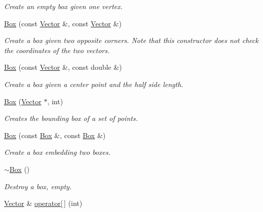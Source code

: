 \begin{DoxyCompactItemize}
\begin{DoxyCompactList}\small\item\em Create an empty box given one vertex. \item\end{DoxyCompactList}\item 
\hyperlink{class_box_a3b265aca59fbaf89be6f7a254088698a}{Box} (const \hyperlink{class_vector}{Vector} \&, const \hyperlink{class_vector}{Vector} \&)
\begin{DoxyCompactList}\small\item\em Create a box given two opposite corners. Note that this constructor does not check the coordinates of the two vectors. \item\end{DoxyCompactList}\item 
\hyperlink{class_box_aa151dd75dfbe1632979853fe157322ea}{Box} (const \hyperlink{class_vector}{Vector} \&, const double \&)
\begin{DoxyCompactList}\small\item\em Create a box given a center point and the half side length. \item\end{DoxyCompactList}\item 
\hyperlink{class_box_a85ed08338073ace8d12833af0c861efb}{Box} (\hyperlink{class_vector}{Vector} $\ast$, int)
\begin{DoxyCompactList}\small\item\em Creates the bounding box of a set of points. \item\end{DoxyCompactList}\item 
\hypertarget{class_box_a0a7c6f0b0405db01518bb3201b00c9a2}{
\hyperlink{class_box_a0a7c6f0b0405db01518bb3201b00c9a2}{Box} (const \hyperlink{class_box}{Box} \&, const \hyperlink{class_box}{Box} \&)}
\label{class_box_a0a7c6f0b0405db01518bb3201b00c9a2}

\begin{DoxyCompactList}\small\item\em Create a box embedding two boxes. \item\end{DoxyCompactList}\item 
\hypertarget{class_box_a6a5e09398e85d602a046b429062fb9c2}{
\hyperlink{class_box_a6a5e09398e85d602a046b429062fb9c2}{$\sim$Box} ()}
\label{class_box_a6a5e09398e85d602a046b429062fb9c2}

\begin{DoxyCompactList}\small\item\em Destroy a box, empty. \item\end{DoxyCompactList}\item 
\hypertarget{class_box_ad41f9a6efac5787613914b12e4c3d11d}{
\hyperlink{class_vector}{Vector} \& \hyperlink{class_box_ad41f9a6efac5787613914b12e4c3d11d}{operator\mbox{[}$\,$\mbox{]}} (int)}
\label{class_box_ad41f9a6efac5787613914b12e4c3d11d}


\end{DoxyCompactItemize}
